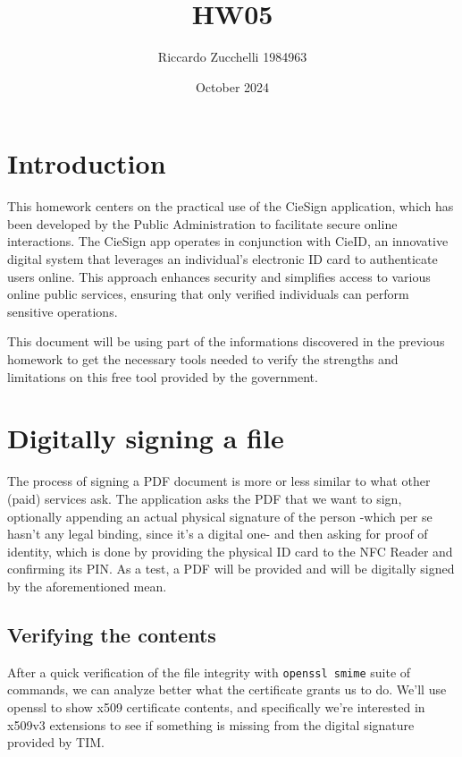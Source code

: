 \documentclass{article}
\title{HW05}
\author{Riccardo Zucchelli 1984963}
\date{October 2024}
\begin{document}
\maketitle

\section{Introduction}
This homework centers on the practical use of the CieSign application, which has been developed by the Public Administration to facilitate secure online interactions. The CieSign app operates in conjunction with CieID, an innovative digital system that leverages an individual's electronic ID card to authenticate users online. This approach enhances security and simplifies access to various online public services, ensuring that only verified individuals can perform sensitive operations. 

This document will be using part of the informations discovered in the previous homework to get the necessary tools needed to verify the strengths and limitations on this free tool provided by the government.

\section{Digitally signing a file}
The process of signing a PDF document is more or less similar to what other (paid) services ask. The application asks the PDF that we want to sign, optionally appending an actual physical signature of the person -which per se hasn't any legal binding, since it's a digital one- and then asking for proof of identity, which is done by providing the physical ID card to the NFC Reader and confirming its PIN.
As a test, a PDF will be provided and will be digitally signed by the aforementioned mean.

\subsection{Verifying the contents}
After a quick verification of the file integrity with \texttt{openssl smime} suite of commands, we can analyze better what the certificate grants us to do. We'll use openssl to show x509 certificate contents, and specifically we're interested in x509v3 extensions to see if something is missing from the digital signature provided by TIM.
\end{document}
